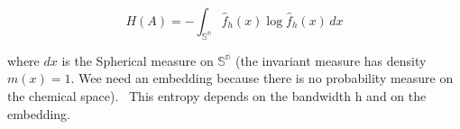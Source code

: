 \[ H(A) = -\int_\mathbb{{S}^n}  \hat{f}_h(x)\log  \hat{f}_h(x) \,dx  \]



where $dx$ is the Spherical measure on $\mathbb{{S}^n}$ (the invariant measure has density $m(x)=1$. Wee need an embedding because there is no probability measure on the chemical space). 
This entropy depends on the bandwidth h and on the embedding.
